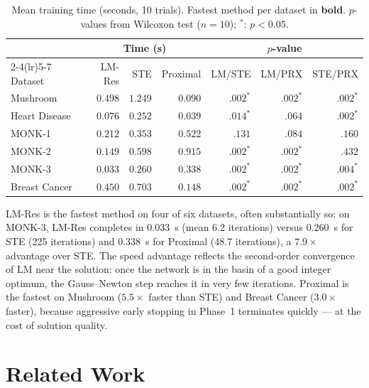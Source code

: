 \documentclass[10pt,a4paper,twoside]{article}
\begin{document}
\begin{table}[h]
\centering
\caption{Mean training time (seconds, 10 trials).
Fastest method per dataset in \textbf{bold}.
$p$-values from Wilcoxon test ($n = 10$); $^{\ast}$: $p < 0.05$.}
\label{tab:time}
\setlength{\tabcolsep}{4pt}
\begin{tabular}{l rrr rrr}
\toprule
 & \multicolumn{3}{c}{Time (s)} & \multicolumn{3}{c}{$p$-value} \\
\cmidrule(lr){2-4}\cmidrule(lr){5-7}
Dataset & LM-Res & STE & Proximal & LM/STE & LM/PRX & STE/PRX \\
\midrule
Mushroom       & $0.498$ & $1.249$ & $\mathbf{0.090}$
               & $.002^{\ast}$ & $.002^{\ast}$ & $.002^{\ast}$ \\
Heart Disease  & $\mathbf{0.076}$ & $0.252$ & $0.039$
               & $.014^{\ast}$ & $.064$ & $.002^{\ast}$ \\
MONK-1         & $\mathbf{0.212}$ & $0.353$ & $0.522$
               & $.131$ & $.084$ & $.160$ \\
MONK-2         & $\mathbf{0.149}$ & $0.598$ & $0.915$
               & $.002^{\ast}$ & $.002^{\ast}$ & $.432$ \\
MONK-3         & $\mathbf{0.033}$ & $0.260$ & $0.338$
               & $.002^{\ast}$ & $.002^{\ast}$ & $.004^{\ast}$ \\
Breast Cancer  & $0.450$ & $0.703$ & $\mathbf{0.148}$
               & $.002^{\ast}$ & $.002^{\ast}$ & $.002^{\ast}$ \\
\bottomrule
\end{tabular}
\end{table}

LM-Res is the fastest method on four of six datasets, often substantially so:
on MONK-3, LM-Res completes in $0.033$~s (mean 6.2 iterations) versus
$0.260$~s for STE (225 iterations) and $0.338$~s for Proximal
(48.7 iterations), a $7.9\times$ advantage over STE.
The speed advantage reflects the second-order convergence of LM near the
solution: once the network is in the basin of a good integer optimum, the
Gauss--Newton step reaches it in very few iterations.
Proximal is the fastest on Mushroom ($5.5\times$ faster than STE) and Breast
Cancer ($3.0\times$ faster), because aggressive early stopping in Phase~1
terminates quickly --- at the cost of solution quality.

\section{Related Work}
\label{sec:related}
\end{document}
